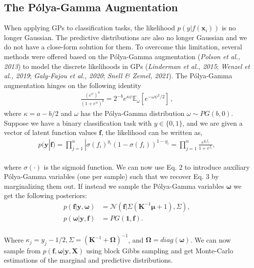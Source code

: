 \documentclass[preprint,11pt]{elsarticle}
\begin{document}
    \subsection{The Pólya-Gamma Augmentation}
    \label{sec:2.3}
        When applying GPs to classification tasks, the likelihood
        $p(y|f(\bm{x}_i))$ is no longer Gaussian. The predictive distributions
        are also no longer Gaussian and we do not have a
        close-form solution for them. To overcome this limitation,
        several methods were offered based on the Pólya-Gamma
        augmentation (\textit{Polson et al., 2013}\cite{polson2013bayesian}) to model the discrete
        likelihoods in GPs (\textit{Linderman et al., 2015}\cite{linderman2015dependent}; \textit{Wenzel et al.,
        2019}\cite{wenzel2019efficient}; \textit{Galy-Fajou et al., 2020}\cite{galy2020multiclass}; \textit{Snell \& Zemel, 2021}\cite{snell2021bayesian}). The
        Pólya-Gamma augmentation hinges on the following identity
            \begin{align}
                \frac{( e^\psi )^a}{(  1+e^\psi)^b} = 2^{-b}e^{\kappa \psi} \mathbb{E}_\omega[ e^{-\omega \psi^2 /2 } ]\,,
            \end{align}
        where $\kappa = a-b /2$ and $\omega$ has the Pólya-Gamma distribution $\omega \sim PG(b,0)$.
        \\
        Suppose we have a binary classification task with $y \in \{0, 1\}$, and we are given a vector of latent function values $\bm{f}$, the likelihood can be written as,
            \begin{align}
                p(\bm{y}|\bm{f}) = \prod_{j=1}^{n}|\sigma( f_i )^{y_i}( 1-\sigma(  f_i) )^{1-y_i} = \prod_{j=1}^{n} \frac{e^{y_i f_i}}{1+e^{f_i}},
            \end{align}
        \\
        where $\sigma(\cdot)$ is the sigmoid function. We can now use Eq. 2
        to introduce auxiliary Pólya-Gamma variables (one per sample)
        such that we recover Eq. 3 by marginalizing them out.
        If instead we sample the Pólya-Gamma variables $\bm{\omega}$ we get
        the following posteriors:
        \begin{equation}
            \begin{split}
                p( \bm{f}|\bm{y}, \bm{\omega} ) &= \mathcal{N}( \bm{f}|\Sigma(\bm{K}^{-1}\bm{\mu} + 1), \Sigma ), \\
                p( \bm{\omega}| \bm{y}, \bm{f} ) &= PG(\bm{1}, \bm{f}).
            \end{split}
        \end{equation}
        \\
        Where $\kappa_j = y_j- 1/2, \Sigma = (\bm{K}^{-1} + \bm{\Omega} )^{-1}$, and 
        $ \bm{\Omega}= diag(\bm{\omega})$. We can now sample from $p(\bm{f},\bm{\omega}|\bm{y},\bm{X})$ using
        block Gibbs sampling and get Monte-Carlo estimations of
        the marginal and predictive distributions.
\end{document}
